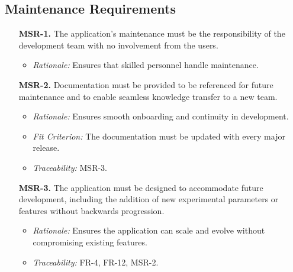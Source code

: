 \documentclass[12pt]{article}
\begin{document}
\subsection{Maintenance Requirements}
\begin{enumerate}
  \item[\textbf{MSR-1.}] The application’s maintenance must be the
  responsibility of the development team with no involvement from the users.
  \begin{itemize}
    \item \textit{Rationale:} Ensures that skilled personnel handle maintenance.
  \end{itemize}

  \item[\textbf{MSR-2.}] Documentation must be provided to be referenced for
  future maintenance and to enable seamless knowledge transfer to a new team.
  \begin{itemize}
    \item \textit{Rationale:} Ensures smooth onboarding and continuity in
    development.
    \item \textit{Fit Criterion:} The documentation must be updated with every
    major release.
    \item \textit{Traceability:} MSR-3.
  \end{itemize}

  \item[\textbf{MSR-3.}] The application must be designed to accommodate future
  development, including the addition of new experimental parameters or features
  without backwards progression.
  \begin{itemize}
    \item \textit{Rationale:} Ensures the application can scale and evolve
    without compromising existing features.
    \item \textit{Traceability:} FR-4, FR-12, MSR-2.
  \end{itemize}
\end{enumerate}
\end{document}
